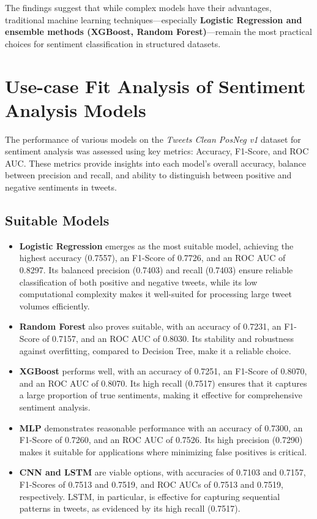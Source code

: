The findings suggest that while complex models have their advantages, traditional machine learning techniques—especially \textbf{Logistic Regression and ensemble methods (XGBoost, Random Forest)}—remain the most practical choices for sentiment classification in structured datasets.

\section{Use-case Fit Analysis of Sentiment Analysis Models}

The performance of various models on the \textit{Tweets Clean PosNeg v1} dataset for sentiment analysis was assessed using key metrics: Accuracy, F1-Score, and ROC AUC. These metrics provide insights into each model's overall accuracy, balance between precision and recall, and ability to distinguish between positive and negative sentiments in tweets.

\subsection{Suitable Models}

\begin{itemize}
    \item \textbf{Logistic Regression} emerges as the most suitable model, achieving the highest accuracy (0.7557), an F1-Score of 0.7726, and an ROC AUC of 0.8297. Its balanced precision (0.7403) and recall (0.7403) ensure reliable classification of both positive and negative tweets, while its low computational complexity makes it well-suited for processing large tweet volumes efficiently.
    \item \textbf{Random Forest} also proves suitable, with an accuracy of 0.7231, an F1-Score of 0.7157, and an ROC AUC of 0.8030. Its stability and robustness against overfitting, compared to Decision Tree, make it a reliable choice.
    \item \textbf{XGBoost} performs well, with an accuracy of 0.7251, an F1-Score of 0.8070, and an ROC AUC of 0.8070. Its high recall (0.7517) ensures that it captures a large proportion of true sentiments, making it effective for comprehensive sentiment analysis.
    \item \textbf{MLP} demonstrates reasonable performance with an accuracy of 0.7300, an F1-Score of 0.7260, and an ROC AUC of 0.7526. Its high precision (0.7290) makes it suitable for applications where minimizing false positives is critical.
    \item \textbf{CNN and LSTM} are viable options, with accuracies of 0.7103 and 0.7157, F1-Scores of 0.7513 and 0.7519, and ROC AUCs of 0.7513 and 0.7519, respectively. LSTM, in particular, is effective for capturing sequential patterns in tweets, as evidenced by its high recall (0.7517).
\end{itemize}

